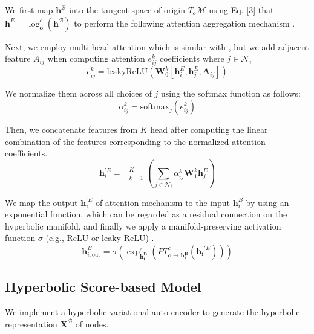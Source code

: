 \documentclass[letterpaper]{article} %
\begin{document}
We first map $\mathbf{h}^\mathcal{B}$ into the tangent space of origin $T_o\mathcal{M}$ using Eq. \eqref{3} that $\mathbf{h}^E=\log _{\boldsymbol{o}}^{c}(\mathbf{h}^\mathcal{B})$ to perform the following attention aggregation mechanism \cite{velivckovic2017graph}.

Next, we employ multi-head attention which is similar with \cite{velivckovic2017graph}, but we add adjacent feature $A_{ij}$ when computing attention $e^k_{i j}$ coefficients where $j\in \mathcal{N}_i$
\begin{equation}
e^{k}_{i j}=\text{leakyReLU}\left(\mathbf{W}^{k}_0 [\mathbf{h}^{E}_{i}, \mathbf{h}^{E}_{j},\mathbf{A}_{ij}]\right)
\end{equation}

We normalize them across all choices of $j$ using the softmax function as follows:
\begin{equation}
\alpha^{k}_{i j}=\mathrm{softmax}_j(e^{k}_{i j})
\end{equation}
%

Then, we concatenate features from $K$ head after computing the linear combination of the features corresponding to the normalized attention coefficients.
\begin{equation}
\mathbf{h}_{i}^{\prime E}=\mathop{\parallel}_{k=1}^{K}\left(\sum_{j \in \mathcal{N}_{i}} \alpha_{i j}^{k} \mathbf{W}^{k}_1 \mathbf{h}^{E}_{j}\right)
\end{equation}

We map the output $\mathbf{h}_{i}^{\prime E}$ of attention mechanism to the input $\mathbf{h}^B_i$ by using an exponential function, which can be regarded as a residual connection \cite{he2016deep} on the hyperbolic manifold, and finally we apply a manifold-preserving activation function $\sigma$ (e.g., ReLU or leaky ReLU) \cite{liu2019hyperbolic}.
\begin{equation}
\mathbf{h}_{i,\text{out}}^{B}=\sigma(\exp _{\boldsymbol{\mathbf{h}_{i}^B}}^{c}(P T_{\mathbf{o} \rightarrow \mathbf{h_{i}^B}}^{c}(\mathbf{h_{i}}^{\prime E})))
\end{equation}


%
\subsection{Hyperbolic Score-based Model}
%
We implement a hyperbolic variational auto-encoder to generate the hyperbolic representation $\boldsymbol{X}^\mathcal{B}$ of nodes.
\end{document}
